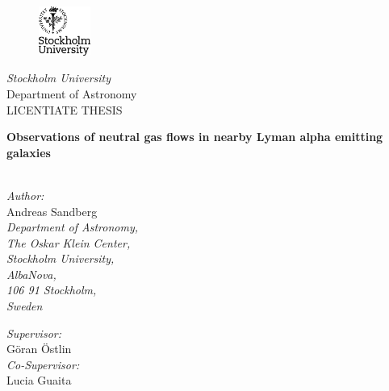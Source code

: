 \documentclass[a4wide,12pt]{book}
\begin{document}
\titlepage
\begin{center}

\begin{figure}[!h]
\vspace{-1.5cm}
\includegraphics[width=0.15\textwidth]{SU-Logga.eps}
\end{figure}
\textit{\Large{Stockholm University}}\\

\Large{Department of Astronomy}\\

\vspace{1.5cm}
\large{LICENTIATE THESIS}\\

\vspace{0.1cm}

{\bf \LARGE{Observations of neutral gas flows in nearby Lyman alpha emitting galaxies\\ \vspace{1.4cm} }}~\\
\end{center}

\vspace{-1.0cm}
\begin{center}
\large{{\it Author:}\\ Andreas Sandberg}\\
\vspace{0.5cm}
\small{\it Department of Astronomy,\\ The Oskar Klein Center,\\ Stockholm University,\\ AlbaNova,\\ 106 91 Stockholm,\\ Sweden}

\vspace{1.5cm}
\large{{\it Supervisor:}\\ G{\"o}ran {\"O}stlin}\\
\vspace{0.5cm}
\large{{\it Co-Supervisor:}\\ Lucia Guaita}\\
\vspace{0.5cm}
\end{center}

\vspace{1.2cm}
\end{document}
